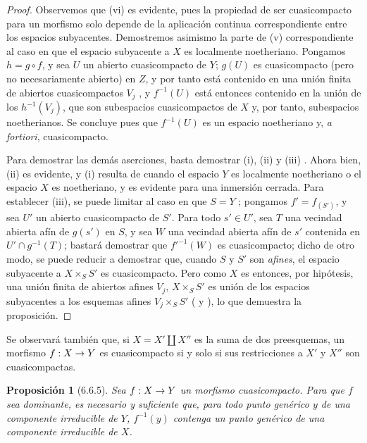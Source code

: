 \documentclass[oneside]{amsart}
\theoremstyle{ega-env-style}
\theoremstyle{ega-thm-env-style}
\newtheorem*{proposition}{Proposición}
\theoremstyle{ega-defn-env-style}
\renewcommand{\to}{\mathchoice{\longrightarrow}{\rightarrow}{\rightarrow}{\rightarrow}}
\newcommand{\oldpage}[2][]{{\marginnote{\normalfont{\textbf{#1}~|~#2}}}\ignorespaces}
\let\EGAOriginalLabel\label
\renewcommand{\label}[1]{\phantomsection\EGAOriginalLabel{#1}}
\begin{document}
\begin{proof}
Observemos que (vi) es evidente, pues la propiedad de ser cuasicompacto para un morfismo solo depende de la aplicación continua correspondiente entre los espacios subyacentes.
Demostremos asimismo la parte de (v) correspondiente al caso en que el espacio subyacente a $X$ es localmente noetheriano.
Pongamos $h=g\circ f$, y sea $U$ un abierto cuasicompacto de $Y$;
$g(U)$ es cuasicompacto (pero no necesariamente abierto) en $Z$, y por tanto está contenido en una unión finita de abiertos cuasicompactos $V_j$ , y $f^{-1}(U)$ está entonces contenido en la unión de los $h^{-1}(V_j)$, que son subespacios cuasicompactos de $X$ y, por tanto, subespacios noetherianos.
Se concluye pues  que $f^{-1}(U)$ es un espacio noetheriano y, \emph{a fortiori}, cuasicompacto.

Para demostrar las demás aserciones, basta demostrar (i), (ii) y (iii) .
Ahora bien, (ii) es evidente, y (i) resulta de  cuando el espacio $Y$ es localmente noetheriano o el espacio $X$ es noetheriano, y es evidente para una inmersión cerrada.
Para establecer (iii),
\oldpage[I]{154}
se puede limitar al caso en que $S=Y$ ;
pongamos $f'=f_{(S')}$, y sea $U'$ un abierto cuasicompacto de $S'$.
Para todo $s'\in U'$, sea $T$ una vecindad abierta afín de $g(s')$ en $S$, y sea $W$ una vecindad abierta afín de $s'$ contenida en $U'\cap g^{-1}(T)$;
bastará demostrar que $f'^{-1}(W)$ es cuasicompacto;
dicho de otro modo, se puede reducir a demostrar que, cuando $S$ y $S'$ son \emph{afines}, el espacio subyacente a $X\times_S S'$ es cuasicompacto.
Pero como $X$ es entonces, por hipótesis, una unión finita de abiertos afines $V_j$, $X\times_S S'$ es unión de los espacios subyacentes a los esquemas afines $V_j\times_S S'$ ( y ), lo que demuestra la proposición.
\end{proof}

Se observará también que, si $X=X'\amalg X''$ es la suma de dos preesquemas, un morfismo $f:X\to Y$ es cuasicompacto si y solo si sus restricciones a $X'$ y $X''$ son cuasicompactas.

\begin{proposition}[6.6.5]
\label{I.6.6.5}
Sea $f:X\to Y$ un morfismo cuasicompacto.
Para que $f$ sea dominante, es necesario y suficiente que, para todo punto genérico $y$ de una componente irreducible de $Y$, $f^{-1}(y)$ contenga un punto genérico de una componente irreducible de $X$.
\end{proposition}
\end{document}
